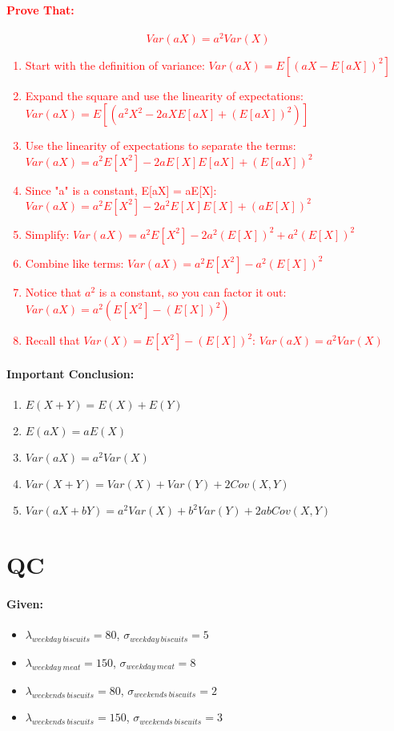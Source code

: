 \documentclass[11pt]{article} %
\begin{document}
\textcolor{red}{\paragraph{\textbf{Prove That:}}
    $$ Var(aX)=a^2 Var(X)$$
    \begin{enumerate}
        \item Start with the definition of variance: $ Var(aX) = E[(aX - E[aX])^2] $
        \item Expand the square and use the linearity of expectations: $ Var(aX) = E[(a^2X^2 - 2aXE[aX] + (E[aX])^2)] $
        \item Use the linearity of expectations to separate the terms: $ Var(aX) = a^2E[X^2] - 2aE[X]E[aX] + (E[aX])^2 $
        \item Since "a" is a constant, E[aX] = aE[X]: $ Var(aX) = a^2E[X^2] - 2a^2E[X]E[X] + (aE[X])^2 $
        \item Simplify: $Var(aX) = a^2E[X^2] - 2a^2(E[X])^2 + a^2(E[X])^2$
        \item Combine like terms: $Var(aX) = a^2E[X^2] - a^2(E[X])^2$
        \item Notice that $a^2$ is a constant, so you can factor it out: $Var(aX) = a^2(E[X^2] - (E[X])^2)$
        \item Recall that $Var(X) = E[X^2] - (E[X])^2$: $Var(aX) = a^2 Var(X)$
    \end{enumerate}}



\paragraph{\textbf{Important Conclusion:}}
\begin{enumerate}
    \item $E(X+Y)=E(X)+E(Y)$
    \item $E(aX)=aE(X)$
    \item $Var(aX)=a^2 Var(X)$
    \item $Var(X+Y)=Var(X)+Var(Y)+2Cov(X,Y)$
    \item $Var(aX+bY)=a^2 Var(X)+b^2 Var(Y)+2ab Cov(X,Y)$
\end{enumerate}

\section{QC}
\paragraph{\textbf{Given:}}
\begin{itemize}
    \item $ \lambda_{weekday\ biscuits}=80 $, $ \sigma_{weekday\ biscuits}=5$
    \item $ \lambda_{weekday\ meat}=150 $, $ \sigma_{weekday\ meat}=8 $
    \item $ \lambda_{weekends\ biscuits}=80 $, $ \sigma_{weekends\ biscuits}=2$
    \item $ \lambda_{weekends\ biscuits}=150 $, $ \sigma_{weekends\ biscuits}=3$
\end{itemize}
\end{document}
